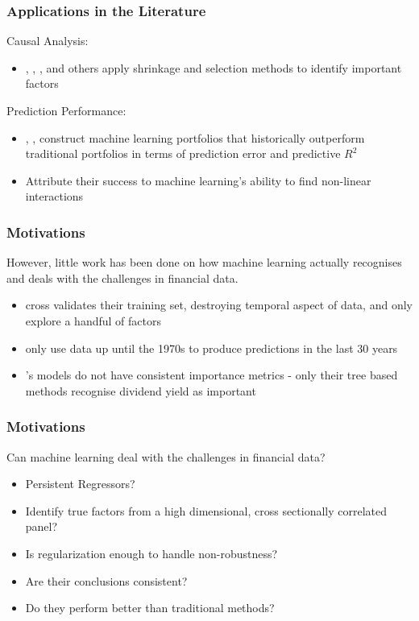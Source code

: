 \documentclass[aspectratio=169]{beamer}
\begin{document}
\begin{frame}
\frametitle{Applications in the Literature}
Causal Analysis:
\begin{itemize}
	\item \cite{kozak_shrinking_2017}, \cite{rapach_forecasting_2013}, \cite{freyberger_dissecting_2017}, and others apply shrinkage and selection methods to identify important factors
\end{itemize}
Prediction Performance:
\begin{itemize}
	\item \cite{gu_empirical_2018}, \cite{feng_deep_2018}, construct machine learning portfolios that historically outperform traditional portfolios in terms of prediction error and predictive $R^2$
	\item Attribute their success to machine learning's ability to find non-linear interactions
\end{itemize}
\end{frame}

\begin{frame}
\frametitle{Motivations}
However, little work has been done on how machine learning actually recognises and deals with the challenges in financial data. 
\begin{itemize}
	\item \cite{feng_deep_2018} cross validates their training set, destroying temporal aspect of data, and only explore a handful of factors
	\item \cite{gu_empirical_2018} only use data up until the 1970s to produce predictions in the last 30 years
	\item \cite{gu_empirical_2018}'s models do not have consistent importance metrics - only their tree based methods recognise dividend yield as important
\end{itemize}
\end{frame}

\begin{frame}
\frametitle{Motivations}
Can machine learning deal with the challenges in financial data?
\begin{itemize}
	\item Persistent Regressors?
	\item Identify true factors from a high dimensional, cross sectionally correlated panel?
	\item Is regularization enough to handle non-robustness?
	\item Are their conclusions consistent?
	\item Do they perform better than traditional methods?
\end{itemize}
\end{frame}
\end{document}

